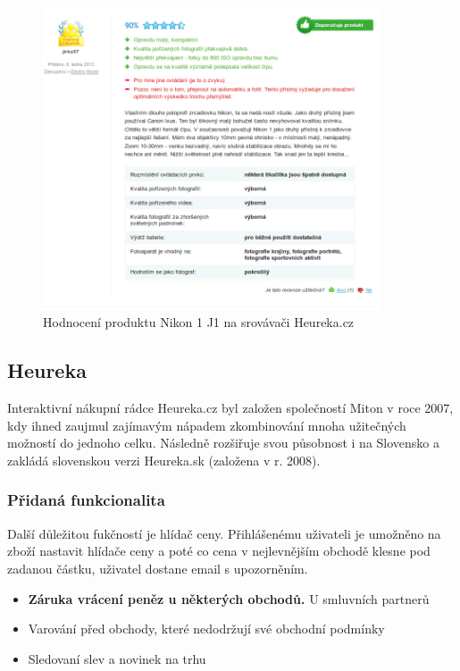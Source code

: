 \begin{figure}[htb]
\begin{center}
\includegraphics[width=100mm]{./pictures/heureka-hodnoceni-produktu.png}
\caption{Hodnocení produktu Nikon 1 J1 na srovávači Heureka.cz}
\label{fig:heureka-hodnoceni-produktu}
\end{center}
\end{figure}

\subsection{Heureka}
Interaktivní nákupní rádce Heureka.cz byl založen společností Miton v roce 2007, kdy ihned zaujmul zajímavým nápadem zkombinování mnoha užitečných možností do jednoho celku. Následně rozšiřuje svou působnost i na Slovensko a zakládá slovenskou verzi Heureka.sk (založena v r. 2008). \cite{website:wiki:heureka}

\subsubsection{Přidaná funkcionalita}
Další důležitou fukčností je hlídač ceny. Přihlášenému uživateli je umožněno na zboží nastavit hlídače ceny a poté co cena v nejlevnějším obchodě klesne pod zadanou částku, uživatel dostane email s upozorněním.

\begin{itemize}
\item \textbf{Záruka vrácení peněz u některých obchodů.} U smluvních partnerů 
\item Varování před obchody, které nedodržují své obchodní podmínky
\item Sledovaní slev a novinek na trhu
\end{itemize}
